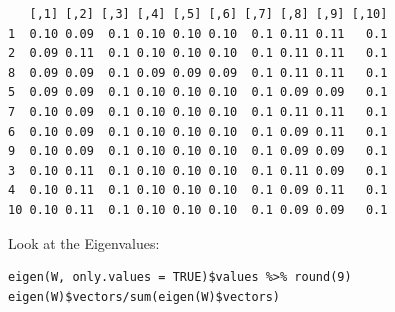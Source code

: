 \documentclass[11pt]{article}
\begin{document}
\begin{verbatim}
   [,1] [,2] [,3] [,4] [,5] [,6] [,7] [,8] [,9] [,10]
1  0.10 0.09  0.1 0.10 0.10 0.10  0.1 0.11 0.11   0.1
2  0.09 0.11  0.1 0.10 0.10 0.10  0.1 0.11 0.11   0.1
8  0.09 0.09  0.1 0.09 0.09 0.09  0.1 0.11 0.11   0.1
5  0.09 0.09  0.1 0.10 0.10 0.10  0.1 0.09 0.09   0.1
7  0.10 0.09  0.1 0.10 0.10 0.10  0.1 0.11 0.11   0.1
6  0.10 0.09  0.1 0.10 0.10 0.10  0.1 0.09 0.11   0.1
9  0.10 0.09  0.1 0.10 0.10 0.10  0.1 0.09 0.09   0.1
3  0.10 0.11  0.1 0.10 0.10 0.10  0.1 0.11 0.09   0.1
4  0.10 0.11  0.1 0.10 0.10 0.10  0.1 0.09 0.11   0.1
10 0.10 0.11  0.1 0.10 0.10 0.10  0.1 0.09 0.09   0.1
\end{verbatim}

Look at the Eigenvalues:
\begin{verbatim}
eigen(W, only.values = TRUE)$values %>% round(9)
eigen(W)$vectors/sum(eigen(W)$vectors)
\end{verbatim}
\end{document}
